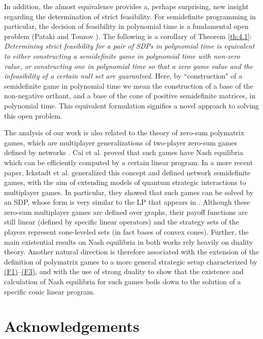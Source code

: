 \documentclass[11pt, twoside]{article}
\numberwithin{equation}{section}
\theoremstyle{definition}
\begin{document}
In addition, the almost equivalence provides a, perhaps surprising, new insight regarding the determination of strict feasibility. For semidefinite programming in particular, the decision of feasibility in polynomial time is a fundamental open problem (Pataki and Touzov \cite{pataki2024exponential}). The following is a corollary of Theorem \ref{th:4.1}: \textit{Determining strict feasibility for a pair of SDPs in polynomial time is equivalent to either constructing a semidefinite game in polynomial time with non-zero value, or constructing one in polynomial time so that a zero game value and the infeasibility of a certain null set are guaranteed}. Here, by ``construction" of a semidefinite game in polynomial time we mean the construction of a base of the non-negative orthant, and a base of the cone of positive semidefinite matrices, in polynomial time. This equivalent formulation signifies a novel approach to solving this open problem.\par

The analysis of our work is also related to the theory of zero-sum polymatrix games, which are multiplayer generalizations of two-player zero-sum games defined by networks \cite{cai2011minmax}. Cai et al. \cite{cai2016zero} proved that such games have Nash equilibria which can be efficiently computed by a certain linear program. In a more recent paper, Ickstadt et al. \cite{ickstadt2026semidefinite} generalized this concept and defined network semidefinite games, with the aim of extending models of quantum strategic interactions to multiplayer games. In particular, they showed that such games can be solved by an SDP, whose form is very similar to the LP that appears in \cite{cai2016zero}. Although these zero-sum multiplayer games are defined over graphs, their payoff functions are still linear (defined by specific linear operators) and the strategy sets of the players represent cone-leveled sets (in fact bases of convex cones). Further, the main existential results on Nash equilibria in both works rely heavily on duality theory. Another natural direction is therefore associated with the extension of the definition of polymatrix games to a more general strategic setup characterized by \hyperlink{f1}{(F1)}--\hyperlink{f3}{(F3)}, and with the use of strong duality to show that the existence and calculation of Nash equilibria for such games boils down to the solution of a specific conic linear program. 


\vspace{-0.3cm}\section*{Acknowledgements}\vspace{-0.3cm}
\end{document}
